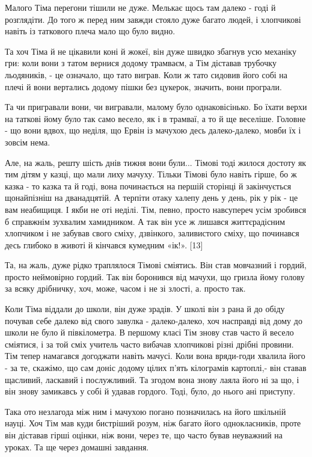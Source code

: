 Малого Тіма перегони тішили не дуже. Мелькає щось там далеко - годі й
розглядіти. До того ж перед ним завжди стояло дуже багато людей, і хлопчикові
навіть із таткового плеча мало що було видно.

Та хоч Тіма й не цікавили коні й жокеї, він дуже швидко збагнув усю механіку
гри: коли вони з татом вернися додому трамваєм, а Тім діставав трубочку
льодяників, - це означало, що тато виграв. Коли ж тато сидовив його собі на
плечі й вони вертались додому пішки без цукерок, значить, вони програли.

Та чи пригравали вони, чи вигравали, малому було однаковісінько. Бо їхати верхи
на таткові йому було так само весело, як і в трамваї, а то й ще веселіше.
Головне - що вони вдвох, що неділя, що Ервін із мачухою десь далеко-далеко,
мовби їх і зовсім нема.

Але, на жаль, решту шість днів тижня вони були... Тімові тоді жилося достоту як
тим дітям у казці, що мали лиху мачуху. Тільки Тімові було навіть гірше, бо ж
казка - то казка та й годі, вона починається на першій сторінці й закінчується
щонайпізніш на дванадцятій. А терпіти отаку халепу день у день, рік у рік - це
вам неабищиця. І якби не оті неділі. Тім, певно, просто навсупереч усім
зробився б справжнім зухвалим хамидником. А так він усе ж лишався життєрадісним
хлопчиком і не забував свого сміху, дзвінкого, заливистого сміху, що починався
десь глибоко в животі й кінчався кумедним «ік!». [13]

Та, на жаль, дуже рідко траплялося Тімові сміятись. Він став мовчазний і
гордий, просто неймовірно гордий. Так він боронився від мачухи, що гризла йому
голову за всяку дрібничку, хоч, може, часом і не зі злості, а. просто так.

Коли Тіма віддали до школи, він дуже зрадів. У школі він з рана й до обіду
почував себе далеко від свого завулка - далеко-далеко, хоч насправді від дому
до школи не було й півкілометра. В першому класі Тім знову став часто й весело
сміятися, і за той сміх учитель часто вибачав хлопчикові різні дрібні провини.
Тім тепер намагався догоджати навіть мачусі. Коли вона вряди-годи хвалила його
- за те, скажімо, що сам доніс додому цілих п'ять кілограмів картоплі,- він
ставав щасливий, ласкавий і послужливий. Та згодом вона знову лаяла його ні за
що, і він знову замикавсь у собі й удавав гордого. Тоді, було, до нього ані
приступу.

Така ото незлагода між ним і мачухою погано позначилась на його шкільній науці.
Хоч Тім мав куди бистріший розум, ніж багато його однокласників, проте він
діставав гірші оцінки, ніж вони, через те, що часто бував неуважний на уроках.
Та ще через домашні завдання.

